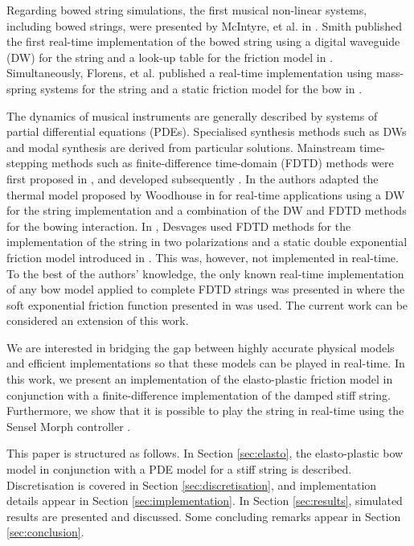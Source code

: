     Regarding bowed string simulations, the first musical non-linear systems, including bowed strings, were presented by McIntyre, et al. in \cite{McIntyre1983}. Smith published the first real-time implementation of the bowed string using a digital waveguide (DW) for the string and a look-up table for the friction model in \cite{Smith1986}. Simultaneously, Florens, et al. published a real-time implementation using mass-spring systems for the string and a static friction model for the bow in \cite{Florens1986}. 
    
    The dynamics of musical instruments are generally described by systems of  partial differential equations (PDEs). Specialised synthesis methods such as DWs \cite{Smith1992} and modal synthesis \cite{Morrison1993} are derived from particular solutions.  Mainstream time-stepping methods such as finite-difference time-domain (FDTD) methods were first proposed in \cite{Hiller, Hiller2, Chaigne}, and developed subsequently \cite{Bilbao2009, Bilbao2018}. In \cite{Maestre2014} the authors adapted the thermal model proposed by Woodhouse in \cite{Woodhouse2003} for real-time applications using a DW for the string implementation and a combination of the DW and FDTD methods for the bowing interaction. In \cite{Desvages2017, Desvages2015}, Desvages used FDTD methods for the implementation of the string in two polarizations and a static double exponential friction model introduced in \cite{Smith2000}. This was, however, not implemented in real-time. To the best of the authors' knowledge, the only known real-time implementation of any bow model applied to complete FDTD strings was presented in \cite{Willemsen2019} where the soft exponential friction function presented in \cite{Bilbao2009} was used. The current work can be considered an extension of this work.
    
    We are interested in bridging the gap between highly accurate physical models and efficient implementations so that these models can be played in real-time. In this work, we present an implementation of the elasto-plastic friction model in conjunction with a finite-difference implementation of the damped stiff string. Furthermore, we show that it is possible to play the string in real-time using the Sensel Morph controller \cite{Sensel2019}.
    
    This paper is structured as follows. In Section \ref{sec:elasto}, the elasto-plastic bow model in conjunction with a PDE model for a stiff string is described. Discretisation is covered in Section \ref{sec:discretisation}, and implementation details appear in Section \ref{sec:implementation}. In Section \ref{sec:results}, simulated results are presented and discussed. Some concluding remarks appear in Section  \ref{sec:conclusion}.
    
